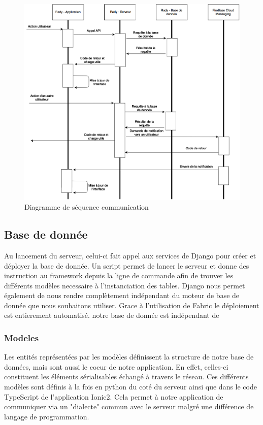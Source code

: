 \documentclass[french]{article}
\begin{document}
	\begin{figure}[H]
		\centering
		\includegraphics[scale=0.5]{../schema/schema-sequence-communication.png}
		\caption{Diagramme de séquence communication}
		\label{Diagramme de séquence communication}
	\end{figure}
	
	\newpage
	
	\subsection{Base de donnée}	
	Au lancement du serveur, celui-ci fait appel aux services de Django pour créer et déployer la base de donnée. Un script permet de lancer le serveur et donne des instruction au framework depuis la ligne de commande afin de trouver les différents modèles necessaire à l'instanciation des tables.
	Django nous permet également de nous rendre complètement indépendant du moteur de base de donnée que nous souhaitons utiliser.
	Grace à l'utilisation de Fabric \cite{fabric} le déploiement est entierement automatisé.
	 notre base de donnée est indépendant de
	\subsubsection{Modeles}
	
	Les entités représentées par les modèles définissent la structure de notre base de données, mais sont aussi le coeur de notre application. 
	En effet, celles-ci constituent les éléments sérialisables échangé à travers le réseau. 
	Ces différents modèles sont définis à la fois en python du coté du serveur ainsi que dans le code TypeScript de l'application Ionic2. Cela permet à notre application de communiquer via un "dialecte" commun avec le serveur malgré une différence de langage de programmation.
\end{document}

